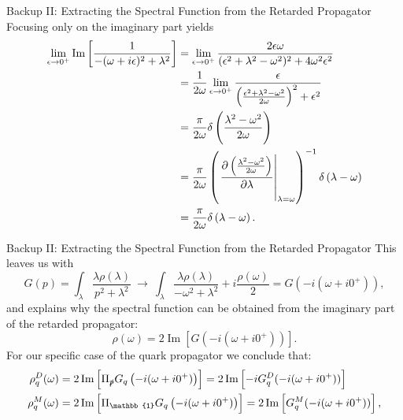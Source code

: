 \documentclass[10pt, aspectratio = 169]{beamer}
\begin{document}
\begin{frame}[noframenumbering]{Backup II: Extracting the Spectral Function from the Retarded Propagator}
Focusing only on the imaginary part yields
\begin{equation}
	\begin{aligned}
		 \lim\limits_{\epsilon\rightarrow 0^+}  \Im\left[\frac{1}{-(\omega + i\epsilon)^2 + \lambda^2}\right] &= \lim\limits_{\epsilon\rightarrow 0^+}  \frac{2\epsilon\omega}{(\epsilon^2 + \lambda^2 - \omega^2)^2 + 4\omega^2\epsilon^2} \\
		&= \frac{1}{2\omega}  \lim\limits_{\epsilon\rightarrow 0^+} \frac{\epsilon}{\left(\frac{\epsilon^2 + \lambda^2 - \omega^2}{2\omega}\right)^2 + \epsilon^2}\\
		&= \frac{\pi}{2\omega}\delta\left(\frac{\lambda^2-\omega^2}{2\omega}\right) \\
		&= \frac{\pi}{2\omega}\left(\eval{\frac{\partial\left(\frac{\lambda^2-\omega^2}{2\omega}\right)}{\partial\lambda}}_{\lambda=\omega}\right)^{-1}\delta\left(\lambda-\omega\right)\\
		&= \frac{\pi}{2\omega}\delta\left(\lambda-\omega\right).
	\end{aligned}
\end{equation}
\end{frame}

\begin{frame}[noframenumbering]{Backup II: Extracting the Spectral Function from the Retarded Propagator}
This leaves us with
\begin{equation}
	G(p) = \int_\lambda\frac{\lambda\rho(\lambda)}{p^2 + \lambda^2}\ \longrightarrow\ \int_\lambda\frac{\lambda\rho(\lambda)}{-\omega^2 + \lambda^2} + i\frac{\rho(\omega)}{2} = G\left(-i(\omega + i0^+)\right),
\end{equation}
and explains why the spectral function can be obtained from the imaginary part of the retarded propagator:
\begin{equation}
	\rho(\omega) =  2 \operatorname{Im}\left[G\left(-i(\omega + i0^+)\right)\right].
\end{equation}
For our specific case of the quark propagator we conclude that:
\begin{align}
	\rho_q^D(\omega) &= 2 \operatorname{Im}\left[\Pi_{\slashed{p}} G_{q}\left(-i(\omega + i0^+)\right)\right] = 2 \operatorname{Im}\left[-i G_q^D(-i(\omega + i0^+))\right] \\
	\rho_q^M(\omega) &= 2 \operatorname{Im}\left[\Pi_{\mathbb{1}} G_{q}\left(-i(\omega + i0^+)\right)\right]  = 2 \operatorname{Im}\left[G_q^M(-i(\omega + i0^+))\right],
	\label{eqn:correct_relation}
\end{align}
\end{frame}
\end{document}

